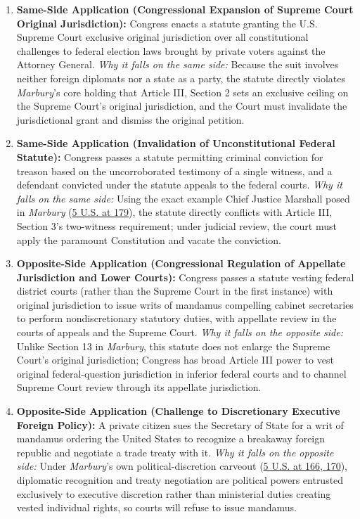 \documentclass[12pt]{article}
\begin{document}
\begin{enumerate}
\item \textbf{Same-Side Application (Congressional Expansion of Supreme Court Original Jurisdiction):} Congress enacts a statute granting the U.S. Supreme Court exclusive original jurisdiction over all constitutional challenges to federal election laws brought by private voters against the Attorney General. \textit{Why it falls on the same side:} Because the suit involves neither foreign diplomats nor a state as a party, the statute directly violates \textit{Marbury}'s core holding that Article III, Section 2 sets an exclusive ceiling on the Supreme Court's original jurisdiction, and the Court must invalidate the jurisdictional grant and dismiss the original petition.

\item \textbf{Same-Side Application (Invalidation of Unconstitutional Federal Statute):} Congress passes a statute permitting criminal conviction for treason based on the uncorroborated testimony of a single witness, and a defendant convicted under the statute appeals to the federal courts. \textit{Why it falls on the same side:} Using the exact example Chief Justice Marshall posed in \textit{Marbury} (\href{https://supreme.justia.com/cases/federal/us/5/137/}{5 U.S. at 179}), the statute directly conflicts with Article III, Section 3's two-witness requirement; under judicial review, the court must apply the paramount Constitution and vacate the conviction.

\item \textbf{Opposite-Side Application (Congressional Regulation of Appellate Jurisdiction and Lower Courts):} Congress passes a statute vesting federal district courts (rather than the Supreme Court in the first instance) with original jurisdiction to issue writs of mandamus compelling cabinet secretaries to perform nondiscretionary statutory duties, with appellate review in the courts of appeals and the Supreme Court. \textit{Why it falls on the opposite side:} Unlike Section 13 in \textit{Marbury}, this statute does not enlarge the Supreme Court's original jurisdiction; Congress has broad Article III power to vest original federal-question jurisdiction in inferior federal courts and to channel Supreme Court review through its appellate jurisdiction.

\item \textbf{Opposite-Side Application (Challenge to Discretionary Executive Foreign Policy):} A private citizen sues the Secretary of State for a writ of mandamus ordering the United States to recognize a breakaway foreign republic and negotiate a trade treaty with it. \textit{Why it falls on the opposite side:} Under \textit{Marbury}'s own political-discretion carveout (\href{https://supreme.justia.com/cases/federal/us/5/137/}{5 U.S. at 166, 170}), diplomatic recognition and treaty negotiation are political powers entrusted exclusively to executive discretion rather than ministerial duties creating vested individual rights, so courts will refuse to issue mandamus.


\end{enumerate}
\end{document}

